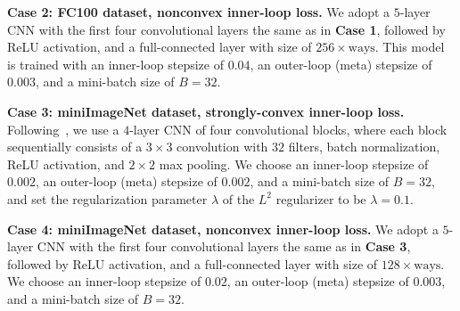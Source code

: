 \documentclass{osudissert96}
\begin{document}
\vspace{0.1cm}
{\noindent \bf Case 2: FC100 dataset, nonconvex inner-loop loss.} We adopt a $5$-layer CNN 
 with the first four convolutional layers the same as in {\bf Case 1}, followed by ReLU activation, and a full-connected layer with size of $256\times \text{ways}$.  This model is trained with an inner-loop stepsize of $0.04$, an outer-loop (meta) stepsize of $0.003$, and a mini-batch size of $B=32$. 
 
 \vspace{0.1cm}
 {\noindent\bf Case 3: miniImageNet  dataset, strongly-convex inner-loop loss.} Following~\cite{raghu2019rapid}, we use a $4$-layer CNN of four convolutional blocks, where each block sequentially consists of  a $3\times 3$ convolution with $32$ filters, batch normalization, ReLU activation, and $2\times 2$
max pooling. We choose an inner-loop stepsize of $0.002$, an outer-loop (meta) stepsize of $0.002$, and a mini-batch size of $B=32$, and set the regularization parameter $\lambda$ of the $L^2$ regularizer  to be $\lambda =0.1$.
 
 \vspace{0.1cm}
 {\noindent\bf Case 4: miniImageNet dataset, nonconvex inner-loop loss.} We adopt a $5$-layer CNN 
 with the first four convolutional layers the same as in {\bf Case 3}, followed by ReLU activation, and a full-connected layer with size of $128\times \text{ways}$. We choose an inner-loop stepsize of $0.02$, an outer-loop (meta) stepsize of $0.003$, and a mini-batch size of $B=32$.

 
\end{document}

